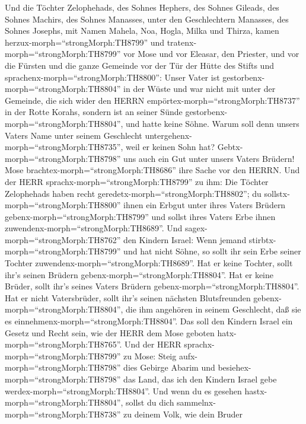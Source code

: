  Und die Töchter Zelophehads, des Sohnes Hephers, des Sohnes
Gileads, des Sohnes Machirs, des Sohnes Manasses, unter den
Geschlechtern Manasses, des Sohnes Josephs, mit Namen Mahela, Noa,
Hogla, Milka und Thirza, kamen herzux-morph=``strongMorph:TH8799''
 und tratenx-morph=``strongMorph:TH8799'' vor Mose und vor
Eleasar, den Priester, und vor die Fürsten und die ganze Gemeinde vor
der Tür der Hütte des Stifts und sprachenx-morph=``strongMorph:TH8800'':
 Unser Vater ist gestorbenx-morph=``strongMorph:TH8804'' in
der Wüste und war nicht mit unter der Gemeinde, die sich wider den HERRN
empörtex-morph=``strongMorph:TH8737'' in der Rotte Korahs, sondern ist
an seiner Sünde gestorbenx-morph=``strongMorph:TH8804'', und hatte keine
Söhne.  Warum soll denn unsers Vaters Name unter seinem
Geschlecht untergehenx-morph=``strongMorph:TH8735'', weil er keinen Sohn
hat? Gebtx-morph=``strongMorph:TH8798'' uns auch ein Gut unter unsers
Vaters Brüdern!  Mose brachtex-morph=``strongMorph:TH8686''
ihre Sache vor den HERRN.  Und der HERR
sprachx-morph=``strongMorph:TH8799'' zu ihm:  Die Töchter
Zelophehads haben recht geredetx-morph=``strongMorph:TH8802''; du
sollstx-morph=``strongMorph:TH8800'' ihnen ein Erbgut unter ihres Vaters
Brüdern gebenx-morph=``strongMorph:TH8799'' und sollst ihres Vaters Erbe
ihnen zuwendenx-morph=``strongMorph:TH8689''.  Und
sagex-morph=``strongMorph:TH8762'' den Kindern Israel: Wenn jemand
stirbtx-morph=``strongMorph:TH8799'' und hat nicht Söhne, so sollt ihr
sein Erbe seiner Tochter zuwendenx-morph=``strongMorph:TH8689''.
 Hat er keine Tochter, sollt ihr's seinen Brüdern
gebenx-morph=``strongMorph:TH8804''.  Hat er keine Brüder,
sollt ihr's seines Vaters Brüdern gebenx-morph=``strongMorph:TH8804''.
 Hat er nicht Vatersbrüder, sollt ihr's seinen nächsten
Blutsfreunden gebenx-morph=``strongMorph:TH8804'', die ihm angehören in
seinem Geschlecht, daß sie es einnehmenx-morph=``strongMorph:TH8804''.
Das soll den Kindern Israel ein Gesetz und Recht sein, wie der HERR dem
Mose geboten hatx-morph=``strongMorph:TH8765''.  Und der
HERR sprachx-morph=``strongMorph:TH8799'' zu Mose: Steig
aufx-morph=``strongMorph:TH8798'' dies Gebirge Abarim und
besiehex-morph=``strongMorph:TH8798'' das Land, das ich den Kindern
Israel gebe werdex-morph=``strongMorph:TH8804''.  Und wenn
du es gesehen hastx-morph=``strongMorph:TH8804'', sollst du dich
sammelnx-morph=``strongMorph:TH8738'' zu deinem Volk, wie dein Bruder
